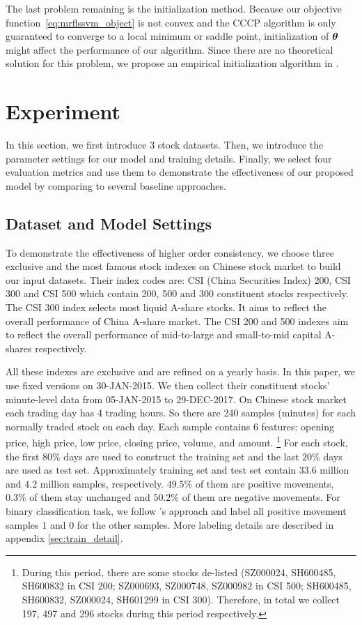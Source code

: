 The last problem remaining is the initialization method. Because
our objective function~\eqref{eq:mrflssvm_object} is not convex
and the CCCP algorithm is only guaranteed to converge to a local
minimum or saddle point\cite{yuille2002concave}, initialization
of ${\bm{\theta}}$ might affect the performance of our algorithm. Since
there are no theoretical solution for this problem, we propose an
empirical initialization algorithm in .

\section{Experiment}
\label{sec:exp}

In this section, we first introduce 3 stock datasets. Then, we
introduce the parameter settings for our model and training
details. Finally, we select four evaluation metrics and use them
to demonstrate the effectiveness of our proposed model by comparing to
several baseline approaches.

\subsection{Dataset and Model Settings}
\label{sec:dataset}

To demonstrate the effectiveness of higher order consistency, we
choose three exclusive and the most famous stock indexes on Chinese
stock market to build our input datasets. Their index codes are:
CSI (China Securities Index) 200, CSI 300 and CSI 500 which
contain 200, 500 and 300 constituent stocks respectively. The CSI
300 index selects most liquid A-share stocks. It aims to reflect
the overall performance of China A-share market. The CSI 200 and
500 indexes aim to reflect the overall performance of mid-to-large
and small-to-mid capital A-shares respectively.

All these indexes are exclusive and are refined on a yearly
basis. In this paper, we use fixed versions on 30-JAN-2015. We
then collect their constituent stocks' minute-level data from
05-JAN-2015 to 29-DEC-2017. On Chinese stock market each trading
day has 4 trading hours. So there are 240 samples (minutes) for
each normally traded stock on each day. Each sample contains 6
features: opening price, high price, low price, closing price,
volume, and amount. \footnote{During this period, there are some
  stocks de-listed (SZ000024, SH600485, SH600832 in CSI 200;
  SZ000693, SZ000748, SZ000982 in CSI 500; SH600485, SH600832,
  SZ000024, SH601299 in CSI 300). Therefore, in total we collect
  197, 497 and 296 stocks during this period respectively.} For
each stock, the first $80\%$ days are used to construct the
training set and the last $20\%$ days are used as test set.
Approximately training set and test set contain $33.6$ million
and $4.2$ million samples, respectively. $49.5\%$ of them are
positive movements, $0.3\%$ of them stay unchanged and $50.2\%$
of them are negative movements. For binary classification task,
we follow 's approach and
label all positive movement samples $1$ and $0$ for the other
samples. More labeling details are described in appendix
\ref{sec:train_detail}.

